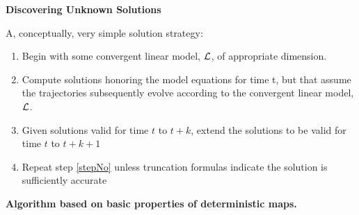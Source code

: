 \documentclass[12pt]{article}
\begin{document}













  {\bf Discovering Unknown Solutions}


A, conceptually, very simple solution strategy:  

  \begin{enumerate}
  \item Begin with some convergent linear model, ${\mathcal{L}}$, of appropriate dimension.
  \item Compute solutions honoring the model equations for time t, 
but that assume the trajectories subsequently 
evolve according to the convergent 
linear model, ${\mathcal{L}}$.
  \item Given solutions valid for time $t$ to $t+k$, extend the solutions to be valid for time $t$ to $t+k+1$ \label{stepNo}
\item Repeat step \ref{stepNo} unless truncation formulas indicate the solution is sufficiently accurate
  \end{enumerate}






  {\bf Algorithm based on basic properties of deterministic maps.}
\end{document}
